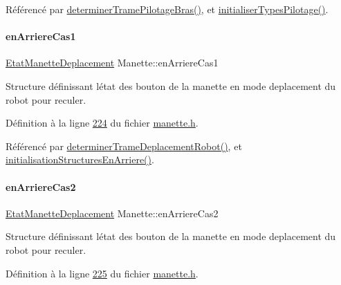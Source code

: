 Référencé par \hyperlink{manette_8cpp_source_l00375}{determiner\+Trame\+Pilotage\+Bras()}, et \hyperlink{manette_8cpp_source_l00040}{initialiser\+Types\+Pilotage()}.

\mbox{\label{class_manette_a915c1867ed0f8f9be3a1bf5d87c23813}} 
\paragraph{\texorpdfstring{en\+Arriere\+Cas1}{enArriereCas1}}
{\footnotesize\ttfamily \hyperlink{struct_etat_manette_deplacement}{Etat\+Manette\+Deplacement} Manette\+::en\+Arriere\+Cas1\hspace{0.3cm}{\ttfamily [private]}}



Structure définissant l\textquotesingle{}état des bouton de la manette en mode deplacement du robot pour reculer. 



Définition à la ligne \hyperlink{manette_8h_source_l00224}{224} du fichier \hyperlink{manette_8h_source}{manette.\+h}.



Référencé par \hyperlink{manette_8cpp_source_l00341}{determiner\+Trame\+Deplacement\+Robot()}, et \hyperlink{manette_8cpp_source_l00127}{initialisation\+Structures\+En\+Arriere()}.

\mbox{\label{class_manette_aa620cef4ea733aa3b9dee18377aee140}} 
\paragraph{\texorpdfstring{en\+Arriere\+Cas2}{enArriereCas2}}
{\footnotesize\ttfamily \hyperlink{struct_etat_manette_deplacement}{Etat\+Manette\+Deplacement} Manette\+::en\+Arriere\+Cas2\hspace{0.3cm}{\ttfamily [private]}}



Structure définissant l\textquotesingle{}état des bouton de la manette en mode deplacement du robot pour reculer. 



Définition à la ligne \hyperlink{manette_8h_source_l00225}{225} du fichier \hyperlink{manette_8h_source}{manette.\+h}.



